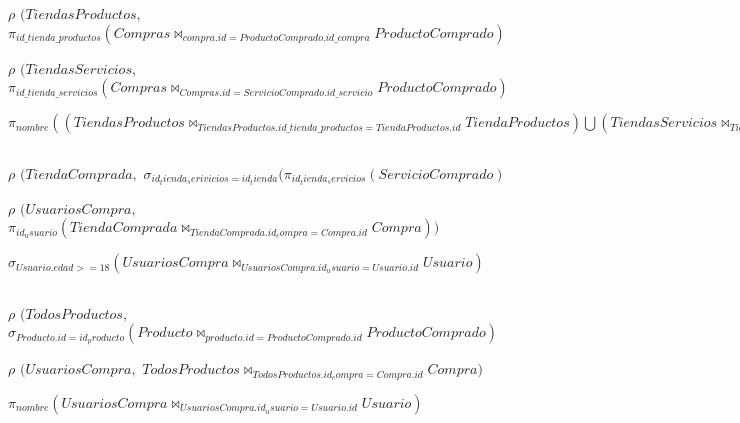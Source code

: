 \documentclass{article}
\begin{document}
$\rho$ $(TiendasProductos,$ $\pi_{id\_tienda\_productos}(Compras\bowtie_{compra.id = ProductoComprado.id\_compra}ProductoComprado)$

$\rho$ $(TiendasServicios,$ $\pi_{id\_tienda\_servicios}(Compras\bowtie_{Compras.id = ServicioComprado.id\_servicio}ProductoComprado)$

$\pi_{nombre} ((TiendasProductos \bowtie_{TiendasProductos.id\_tienda\_productos = TiendaProductos.id} TiendaProductos) \bigcup (TiendasServicios \bowtie_{TiendasServicios.id\_tienda\_servicios = TiendaServicios.id} TiendaServicios))$

\subsection{}


$\rho$ $(TiendaComprada,$ $\sigma_{id_tienda_serivicios=id_tienda}(\pi_{id_tienda_servicios}(ServicioComprado)$

$\rho$ $(UsuariosCompra,$ $\pi_{id_usuario}(TiendaComprada \bowtie_{TiendaComprada.id_compra = Compra.id}Compra))$

$\sigma_{Usuario.edad >= 18}(UsuariosCompra\bowtie_{UsuariosCompra.id_usuario = Usuario.id}Usuario)$

\subsection{}


$\rho$ $(TodosProductos,$ $\sigma_{Producto.id=id_producto}(Producto \bowtie_{producto.id = ProductoComprado.id}ProductoComprado)$


$\rho$ $(UsuariosCompra,$ $TodosProductos \bowtie_{TodosProductos.id_compra = Compra.id}Compra)$


$\pi_{nombre}(UsuariosCompra \bowtie_{UsuariosCompra.id_usuario = Usuario.id}Usuario)$
\end{document}
